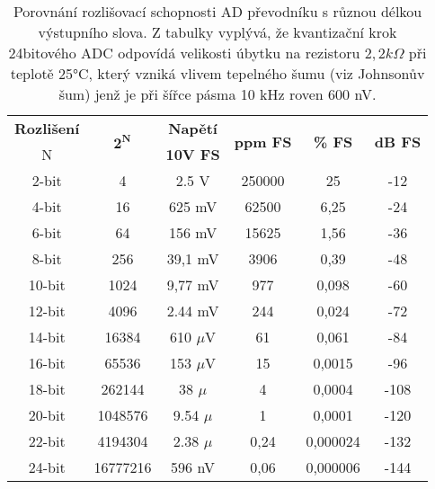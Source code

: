          \begin{table}[ht!]
           \centering
            \setlength{\tabcolsep}{5pt}
            \begin{tabular}{|c|c|c|c|c|c|}
              \hline
                \textbf{Rozlišení} & \multirow{2}{*}{$\mathbf{2^N}$} &  \textbf{Napětí} & \multirow{2}{*}{\textbf{ppm FS}}& \multirow{2}{*}{\textbf{\% FS}}&  \multirow{2}{*}{\textbf{dB FS}} \\
                         N     &           &  \textbf{10V FS} &        &             &          \\
              \hline
                       2-bit   &         4 &            2.5 V & 250000 &          25 &  -12     \\
              \hline
                       4-bit   &        16 &           625 mV &  62500 &        6,25 &  -24     \\
              \hline
                       6-bit   &        64 &           156 mV &  15625 &        1,56 &  -36     \\
              \hline
                       8-bit   &       256 &          39,1 mV &   3906 &        0,39 &  -48     \\
              \hline
                      10-bit   &      1024 &          9,77 mV &    977 &       0,098 &  -60     \\
              \hline
                      12-bit   &      4096 &          2.44 mV &    244 &       0,024 &  -72     \\
              \hline
                      14-bit   &     16384 &       610 $\mu$V &     61 &       0,061 &  -84     \\
              \hline
                      16-bit   &     65536 &       153 $\mu$V &     15 &      0,0015 &  -96     \\
              \hline
                      18-bit   &    262144 &         38 $\mu$ &      4 &      0,0004 & -108     \\
              \hline
                      20-bit   &   1048576 &       9.54 $\mu$ &      1 &      0,0001 & -120     \\
              \hline
                      22-bit   &   4194304 &       2.38 $\mu$ &   0,24 &    0,000024 & -132     \\
              \hline
                      24-bit   &  16777216 &           596 nV &   0,06 &    0,000006 & -144     \\
              \hline
           \end{tabular}
           \caption[Kvantizace: Velikost LSB]{Porovnání rozlišovací schopnosti AD převodníku s různou délkou  
                    výstupního slova. Z tabulky vyplývá, že kvantizační krok 24bitového ADC odpovídá 
                    velikosti úbytku na rezistoru $2,2 k\Omega$ při teplotě 25°C, který vzniká vlivem 
                    tepelného šumu (viz Johnsonův šum) jenž je při šířce pásma 10 kHz roven 600 nV. }
           \label{AES:tab_10b_ADC_resolution}
         \end{table}

